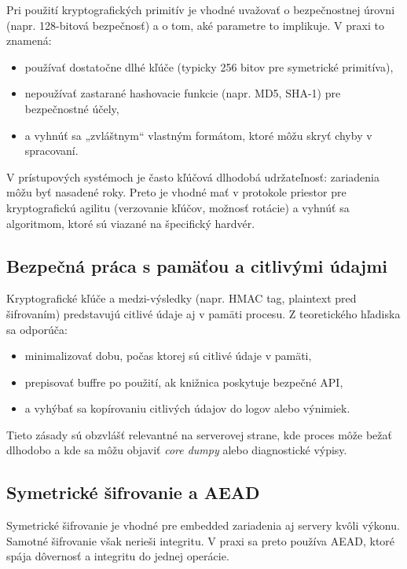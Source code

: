 \documentclass[journal,a4paper,onecolumn]{IEEEtran}
\begin{document}
Pri použití kryptografických primitív je vhodné uvažovať o bezpečnostnej úrovni (napr. 128-bitová bezpečnosť) a o tom, aké parametre to implikuje. V praxi to znamená:

\begin{itemize}[leftmargin=*,itemsep=2pt]
  \item používať dostatočne dlhé kľúče (typicky 256 bitov pre symetrické primitíva),
  \item nepoužívať zastarané hashovacie funkcie (napr. MD5, SHA-1) pre bezpečnostné účely,
  \item a vyhnúť sa „zvláštnym“ vlastným formátom, ktoré môžu skryť chyby v spracovaní.
\end{itemize}

V prístupových systémoch je často kľúčová dlhodobá udržateľnosť: zariadenia môžu byť nasadené roky. Preto je vhodné mať v protokole priestor pre kryptografickú agilitu (verzovanie kľúčov, možnosť rotácie) a vyhnúť sa algoritmom, ktoré sú viazané na špecifický hardvér.

\subsection{Bezpečná práca s pamäťou a citlivými údajmi}

Kryptografické kľúče a medzi-výsledky (napr. HMAC tag, plaintext pred šifrovaním) predstavujú citlivé údaje aj v pamäti procesu. Z teoretického hľadiska sa odporúča:

\begin{itemize}[leftmargin=*,itemsep=2pt]
  \item minimalizovať dobu, počas ktorej sú citlivé údaje v pamäti,
  \item prepisovať buffre po použití, ak knižnica poskytuje bezpečné API,
  \item a vyhýbať sa kopírovaniu citlivých údajov do logov alebo výnimiek.
\end{itemize}

Tieto zásady sú obzvlášť relevantné na serverovej strane, kde proces môže bežať dlhodobo a kde sa môžu objaviť \emph{core dumpy} alebo diagnostické výpisy.

\subsection{Symetrické šifrovanie a AEAD}

Symetrické šifrovanie je vhodné pre embedded zariadenia aj servery kvôli výkonu. Samotné šifrovanie však nerieši integritu. V praxi sa preto používa AEAD, ktoré spája dôvernosť a integritu do jednej operácie.
\end{document}
